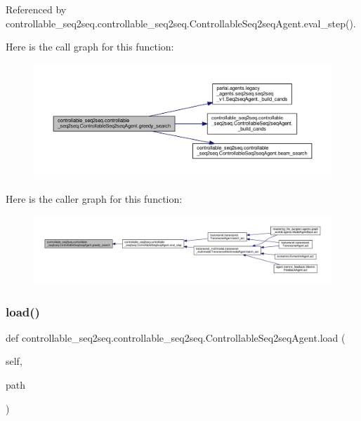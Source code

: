Referenced by controllable\+\_\+seq2seq.\+controllable\+\_\+seq2seq.\+Controllable\+Seq2seq\+Agent.\+eval\+\_\+step().

Here is the call graph for this function\+:
\nopagebreak
\begin{figure}[H]
\begin{center}
\leavevmode
\includegraphics[width=350pt]{classcontrollable__seq2seq_1_1controllable__seq2seq_1_1ControllableSeq2seqAgent_a5cbdb2b3630855612a695f82880b763b_cgraph}
\end{center}
\end{figure}
Here is the caller graph for this function\+:
\nopagebreak
\begin{figure}[H]
\begin{center}
\leavevmode
\includegraphics[width=350pt]{classcontrollable__seq2seq_1_1controllable__seq2seq_1_1ControllableSeq2seqAgent_a5cbdb2b3630855612a695f82880b763b_icgraph}
\end{center}
\end{figure}
\mbox{\label{classcontrollable__seq2seq_1_1controllable__seq2seq_1_1ControllableSeq2seqAgent_a86c91e473f1a1d2345aa70658f0acbeb}} 
\subsubsection{\texorpdfstring{load()}{load()}}
{\footnotesize\ttfamily def controllable\+\_\+seq2seq.\+controllable\+\_\+seq2seq.\+Controllable\+Seq2seq\+Agent.\+load (\begin{DoxyParamCaption}\item[{}]{self,  }\item[{}]{path }\end{DoxyParamCaption})}

